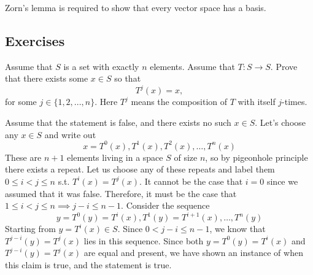   Zorn's lemma is required to show that every vector space has a basis. 

\subsection{Exercises}

  \begin{exercise}
    Assume that $S$ is a set with exactly $n$ elements. Assume that $T : S \to S$.
    Prove that there exists some $x \in S$ so that
    \begin{equation}
      T^j(x) = x,
    \end{equation}
    for some $j \in \{1,2,...,n\}$. Here $T^j$ means the composition of $T$ with itself
    $j$-times.
  \end{exercise}
  \begin{solution}
    Assume that the statement is false, and there exists no such $x \in S$. Let's choose any $x \in S$ and write out 
    \begin{equation}
      x = T^0 (x) , T^1 (x), T^2 (x), \ldots, T^n (x)
    \end{equation}
    These are $n+1$ elements living in a space $S$ of size $n$, so by pigeonhole principle there exists a repeat. Let us choose any of these repeats and label them $0 \leq i < j \leq n$ s.t. $T^i (x) = T^j (x)$. It cannot be the case that $i = 0$ since we assumed that it was false. Therefore, it must be the case that $1 \leq i < j \leq n \implies j - i \leq n-1$. Consider the sequence 
    \begin{equation}
      y = T^0 (y) = T^i (x), T^1 (y) = T^{i+1} (x), \ldots, T^n (y)
    \end{equation}
    Starting from $y = T^i (x) \in S$. Since $0 < j - i \leq n - 1$, we know that $T^{j-i} (y) = T^j (x)$ lies in this sequence. Since both $y = T^0 (y) = T^i (x)$ and $T^{j-i} (y) = T^j (x)$ are equal and present, we have shown an instance of when this claim is true, and the statement is true. 
  \end{solution}

